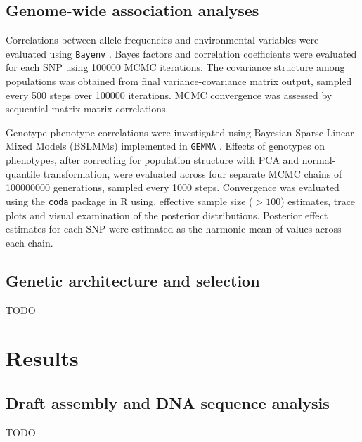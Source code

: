 \documentclass[smallextended]{svjour3}
\begin{document}
\subsection*{Genome-wide association analyses}

Correlations between allele frequencies and environmental variables were
evaluated using \texttt{Bayenv} \citep[][version
2.0]{Gunther:2013ik,COOP:2010ke}. Bayes factors and correlation coefficients
were evaluated for each SNP using \num{100000} MCMC iterations.  The covariance
structure among populations was obtained from final variance-covariance matrix
output, sampled every 500 steps over \num{100000} iterations.  MCMC convergence
was assessed by sequential matrix-matrix correlations.

Genotype-phenotype correlations were investigated using Bayesian Sparse Linear Mixed
Models (BSLMMs) implemented in \texttt{GEMMA} \citep[][version
0.94.1]{Zhou:2013fh}.  Effects of  genotypes on phenotypes, after correcting for
population structure with PCA and normal-quantile transformation, were evaluated
across four separate MCMC chains of \num{100000000} generations, sampled  every
1000 steps.  Convergence was evaluated using the \texttt{coda} package in R
\citep[][version 0.18.1]{coda} using, effective sample size ($> 100$) estimates,
trace plots and visual examination of the posterior distributions. Posterior
effect estimates for each SNP were estimated as the harmonic mean of values
across each chain.


\subsection*{Genetic architecture and selection}
TODO

\section*{Results}

\subsection*{Draft assembly and DNA sequence analysis}
TODO
\end{document}
